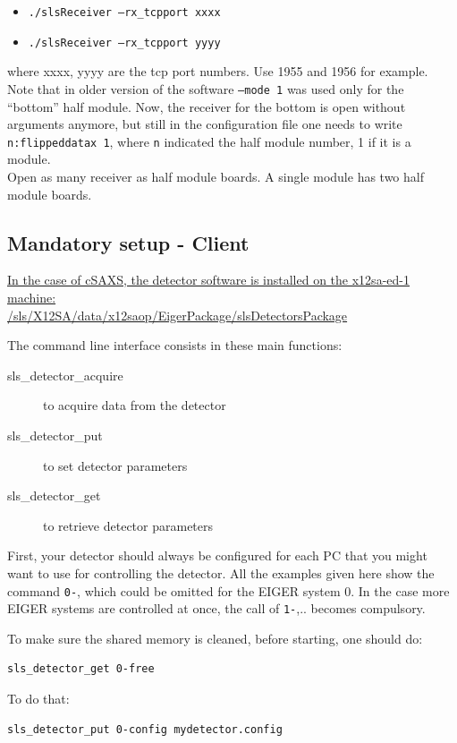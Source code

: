 \documentclass{article}
\begin{document}
\begin{itemize}
\item {\tt{./slsReceiver --rx\_tcpport xxxx}} 
\item {\tt{./slsReceiver --rx\_tcpport yyyy}}
\end{itemize}
where xxxx, yyyy are the tcp port numbers. Use 1955 and 1956 for example. Note that in older version of the software {\tt{--mode 1}} was used only for the ``bottom'' half module. Now, the receiver for the bottom is open without arguments anymore, but still in the configuration file one needs to write {\tt{n:flippeddatax 1}}, where {\tt{n}} indicated the half module number, 1 if it is a module.
\\ Open as many receiver as half module boards. A single module has two half module boards.

\subsection{Mandatory setup - Client}

\underline{In the case of cSAXS, the detector software is installed on the x12sa-ed-1 machine:}\\
\underline{/sls/X12SA/data/x12saop/EigerPackage/slsDetectorsPackage}

The command line interface consists in these main functions:
\begin{description}
\item[sls\_detector\_acquire] to acquire data from the detector
\item[sls\_detector\_put] to set detector parameters
\item[sls\_detector\_get] to retrieve detector parameters
\end{description}

First, your detector should always be configured for each PC that you might want to use for controlling the detector. All the examples given here show the command {\tt{0-}}, which could be omitted for the EIGER system $0$. In the case more EIGER systems are controlled at once, the call of {\tt{1-}},.. becomes compulsory.

To make sure the shared memory is cleaned, before starting, one should do:  
\begin{verbatim}
sls_detector_get 0-free
\end{verbatim}
To do that:
\begin{verbatim}
sls_detector_put 0-config mydetector.config
\end{verbatim}
\end{document}
